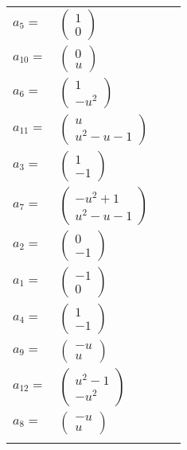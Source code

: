 \documentclass[1p]{elsarticle_modified}
\theoremstyle{definition}
\begin{document}
\begin{tabular}{m{7pt} m{180pt} m{7pt} m{180pt} }
\flushright $a_{5}=$&$\begin{pmatrix}1\\0\end{pmatrix}$ \\
\flushright $a_{10}=$&$\begin{pmatrix}0\\u\end{pmatrix}$ \\
\flushright $a_{6}=$&$\begin{pmatrix}1\\- u^2\end{pmatrix}$ \\
\flushright $a_{11}=$&$\begin{pmatrix}u\\u^2- u-1\end{pmatrix}$ \\
\flushright $a_{3}=$&$\begin{pmatrix}1\\-1\end{pmatrix}$ \\
\flushright $a_{7}=$&$\begin{pmatrix}- u^2+1\\u^2- u-1\end{pmatrix}$ \\
\flushright $a_{2}=$&$\begin{pmatrix}0\\-1\end{pmatrix}$ \\
\flushright $a_{1}=$&$\begin{pmatrix}-1\\0\end{pmatrix}$ \\
\flushright $a_{4}=$&$\begin{pmatrix}1\\-1\end{pmatrix}$ \\
\flushright $a_{9}=$&$\begin{pmatrix}- u\\u\end{pmatrix}$ \\
\flushright $a_{12}=$&$\begin{pmatrix}u^2-1\\- u^2\end{pmatrix}$ \\
\flushright $a_{8}=$&$\begin{pmatrix}- u\\u\end{pmatrix}$\\&\end{tabular}
\end{document}
